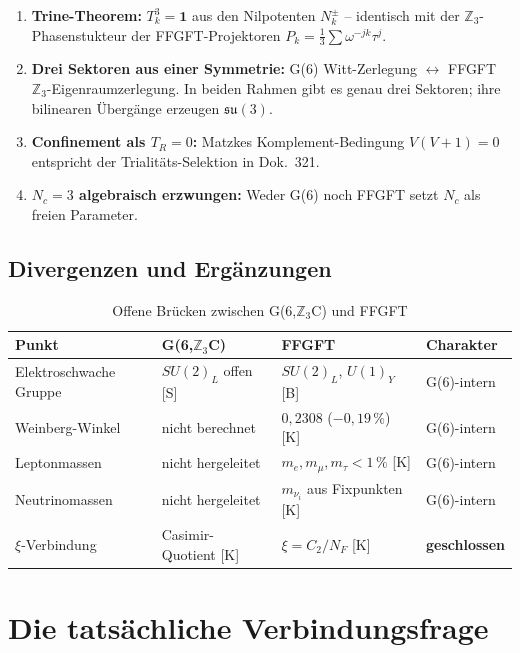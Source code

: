 \begin{enumerate}
  \item \textbf{Trine-Theorem:} $T_k^3 = \mathbf{1}$ aus den Nilpotenten
    $N_k^\pm$ -- identisch mit der $\mathbb{Z}_3$-Phasenstukteur der
    FFGFT-Projektoren $P_k = \frac{1}{3}\sum\omega^{-jk}\tau^j$.
  \item \textbf{Drei Sektoren aus einer Symmetrie:}
    G(6) Witt-Zerlegung $\leftrightarrow$ FFGFT $\mathbb{Z}_3$-Eigenraumzerlegung.
    In beiden Rahmen gibt es genau drei Sektoren; ihre bilinearen Übergänge
    erzeugen $\mathfrak{su}(3)$.
  \item \textbf{Confinement als $T_R = 0$:} Matzkes Komplement-Bedingung
    $V(V+1) = 0$ entspricht der Trialitäts-Selektion in Dok.~321.
  \item \textbf{$N_c = 3$ algebraisch erzwungen:}
    Weder G(6) noch FFGFT setzt $N_c$ als freien Parameter.
\end{enumerate}

\subsection{Divergenzen und Ergänzungen}

\begin{table}[h]
\centering
\caption{Offene Brücken zwischen G(6,$\mathbb{Z}_3$C) und FFGFT}
\label{tab:offen}
\begin{tabular}{llll}
\toprule
Punkt & G(6,$\mathbb{Z}_3$C) & FFGFT & Charakter \\
\midrule
Elektroschwache Gruppe & $SU(2)_L$ offen [S] & $SU(2)_L$, $U(1)_Y$ [B] & G(6)-intern \\
Weinberg-Winkel & nicht berechnet & $0{,}2308$ ($-0{,}19\,\%$) [K] & G(6)-intern \\
Leptonmassen & nicht hergeleitet & $m_e, m_\mu, m_\tau < 1\,\%$ [K] & G(6)-intern \\
Neutrinomassen & nicht hergeleitet & $m_{\nu_i}$ aus Fixpunkten [K] & G(6)-intern \\
$\xi$-Verbindung & Casimir-Quotient [K] & $\xi = C_2/N_F$ [K] & \textbf{geschlossen} \\
\bottomrule
\end{tabular}
\end{table}

\section{Die tatsächliche Verbindungsfrage}

